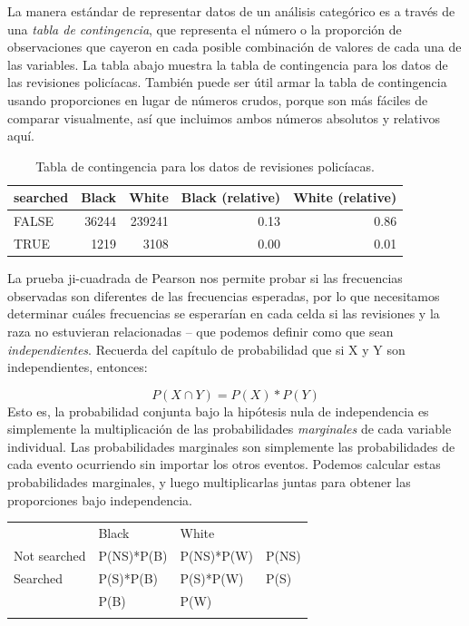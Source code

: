 \documentclass[
  12pt,
]{book}
\begin{document}
La manera estándar de representar datos de un análisis categórico es a través de una \emph{tabla de contingencia}, que representa el número o la proporción de observaciones que cayeron en cada posible combinación de valores de cada una de las variables. La tabla abajo muestra la tabla de contingencia para los datos de las revisiones policíacas. También puede ser útil armar la tabla de contingencia usando proporciones en lugar de números crudos, porque son más fáciles de comparar visualmente, así que incluimos ambos números absolutos y relativos aquí.

\begin{table}

\caption{\label{tab:unnamed-chunk-76}Tabla de contingencia para los datos de revisiones policíacas.}
\centering
\begin{tabular}[t]{l|r|r|r|r}
\hline
searched & Black & White & Black (relative) & White (relative)\\
\hline
FALSE & 36244 & 239241 & 0.13 & 0.86\\
\hline
TRUE & 1219 & 3108 & 0.00 & 0.01\\
\hline
\end{tabular}
\end{table}

La prueba ji-cuadrada de Pearson nos permite probar si las frecuencias observadas son diferentes de las frecuencias esperadas, por lo que necesitamos determinar cuáles frecuencias se esperarían en cada celda si las revisiones y la raza no estuvieran relacionadas -- que podemos definir como que sean \emph{independientes}. Recuerda del capítulo de probabilidad que si X y Y son independientes, entonces:

\[
P(X \cap Y) = P(X) * P(Y)
\]
Esto es, la probabilidad conjunta bajo la hipótesis nula de independencia es simplemente la multiplicación de las probabilidades \emph{marginales} de cada variable individual. Las probabilidades marginales son simplemente las probabilidades de cada evento ocurriendo sin importar los otros eventos. Podemos calcular estas probabilidades marginales, y luego multiplicarlas juntas para obtener las proporciones bajo independencia.

\begin{longtable}[]{@{}llll@{}}
\toprule
& Black & White & \\ \addlinespace
\midrule
\endhead
Not searched & P(NS)*P(B) & P(NS)*P(W) & P(NS) \\ \addlinespace
Searched & P(S)*P(B) & P(S)*P(W) & P(S) \\ \addlinespace
& P(B) & P(W) & \\ \addlinespace
\bottomrule
\end{longtable}
\end{document}
